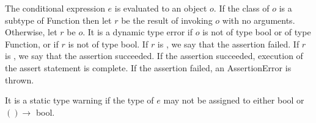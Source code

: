 \documentclass{article}
\newcommand{\code}[1]{{\sf #1}}
\begin{document}
\LMHash{}
The conditional expression $e$ is evaluated to an object $o$. If the class of $o$ is a subtype of \code{Function} then let $r$ be the result of invoking $o$ with no arguments. Otherwise, let $r$ be $o$. 
It is a dynamic type error if $o$ is not of type \code{bool} or of type \code{Function}, or if $r$ is not of type \code{bool}.  If $r$ is \FALSE{}, we say that the assertion failed. If $r$ is \TRUE{}, we say that the assertion succeeded. If the assertion succeeded, execution of the assert statement is complete. If the assertion failed, an \code{AssertionError} is thrown.


\LMHash{}
 It is a static type warning if the type of $e$ may not be assigned to either  \code{bool} or $() \rightarrow$ \code{bool}.  






\end{document}
